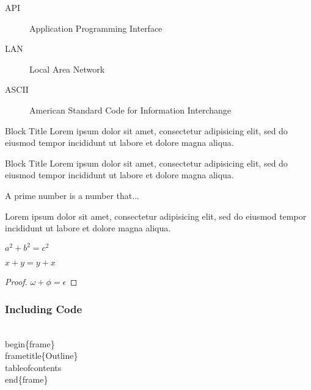 \documentclass{beamer}
\begin{document}
\begin{frame}
\begin{description}
\item[API] Application Programming Interface
\item[LAN] Local Area Network
\item[ASCII] American Standard Code for Information Interchange
\end{description}
\end{frame}

\begin{frame}
\begin{block}{Block Title}
Lorem ipsum dolor sit amet, consectetur adipisicing elit, sed do eiusmod tempor incididunt ut labore et dolore magna aliqua.
\end{block}

\begin{alertblock}{Block Title}
Lorem ipsum dolor sit amet, consectetur adipisicing elit, sed do eiusmod tempor incididunt ut labore et dolore magna aliqua.
\end{alertblock}

\begin{frame}
\begin{definition}
A prime number is a number that...
\end{definition}

\begin{example}
Lorem ipsum dolor sit amet, consectetur adipisicing elit, sed do eiusmod tempor incididunt ut labore et dolore magna aliqua.
\end{example}
\end{frame}

\begin{frame}
\begin{theorem}[Pythagoras] 
$ a^2 + b^2 = c^2$
\end{theorem}
\begin{corollary}
$ x + y = y + x  $
\end{corollary}
\begin{proof}
$\omega +\phi = \epsilon $
\end{proof}
\end{frame}

\begin{frame}[fragile]
\frametitle{Including Code}
\begin{semiverbatim}
\\begin\{frame\}
\\frametitle\{Outline\}
\\tableofcontents
\\end\{frame\}
\end{semiverbatim}
\end{frame}


\end{frame}
\end{document}
